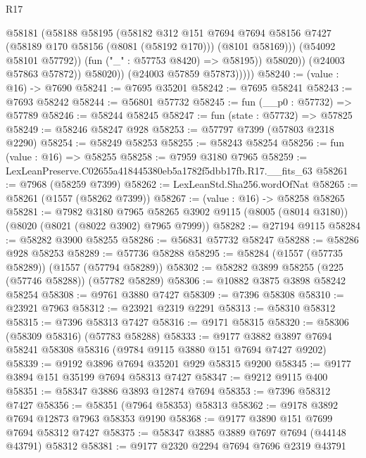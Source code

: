 \begin{lexlean}{R17}
\begin{coremodule}
                        @58181
                          (@58188
                            @58195
                            (@58182
                              @312
                              @151
                              @7694
                              @7694
                              @58156
                              @7427
                              (@58189 @170 @58156 (@8081 (@58192 @170)))
                              (@8101 @58169)))
                          (@54092 @58101 @57792))
                        (fun ("_" : @57753 @8420) => @58195))
                      @58020))
                  (@24003 @57863 @57872))
                @58020))
            (@24003 @57859 @57873)))))
@58240 := (value : @16) -> @7690
@58241 := @7695 @35201
@58242 := @7695 @58241
@58243 := @7693 @58242
@58244 := @56801 @57732
@58245 := fun (__p0 : @57732) => @57789
@58246 := @58244 @58245
@58247 := fun (state : @57732) => @57825
@58249 := @58246 @58247 @928
@58253 := @57797 @7399 (@57803 @2318 @2290)
@58254 := @58249 @58253
@58255 := @58243 @58254
@58256 := fun (value : @16) => @58255
@58258 := @7959 @3180 @7965
@58259 := LexLeanPreserve.C02655a418445380eb5a1782f5dbb17fb.R17.__fits_63
@58261 := @7968 (@58259 @7399)
@58262 := LexLeanStd.Sha256.wordOfNat
@58265 := @58261 (@1557 (@58262 @7399))
@58267 := (value : @16) -> @58258 @58265
@58281 := @7982
    @3180
    @7965
    @58265
    @3902
    @9115
    (@8005 (@8014 @3180))
    (@8020 (@8021 (@8022 @3902) @7965 @7999))
@58282 := @27194 @9115
@58284 := @58282 @3900 @58255
@58286 := @56831 @57732 @58247
@58288 := @58286 @928 @58253
@58289 := @57736 @58288
@58295 := @58284 (@1557 (@57735 @58289)) (@1557 (@57794 @58289))
@58302 := @58282 @3899 @58255 (@225 (@57746 @58288)) (@57782 @58289)
@58306 := @10882 @3875 @3898 @58242 @58254
@58308 := @9761 @3880 @7427
@58309 := @7396 @58308
@58310 := @23921 @7963
@58312 := @23921 @2319 @2291
@58313 := @58310 @58312
@58315 := @7396 @58313 @7427
@58316 := @9171 @58315
@58320 := @58306 (@58309 @58316) (@57783 @58288)
@58333 := @9177 @3882 @3897 @7694 @58241 @58308 @58316 (@9784 @9115 @3880 @151 @7694 @7427 @9202)
@58339 := @9192 @3896 @7694 @35201 @929 @58315 @9200
@58345 := @9177 @3894 @151 @35199 @7694 @58313 @7427
@58347 := @9212 @9115 @400
@58351 := @58347 @3886 @3893 @12874 @7694
@58353 := @7396 @58312 @7427
@58356 := @58351 (@7964 @58353) @58313
@58362 := @9178 @3892 @7694 @12873 @7963 @58353 @9190
@58368 := @9177 @3890 @151 @7699 @7694 @58312 @7427
@58375 := @58347 @3885 @3889 @7697 @7694 (@44148 @43791) @58312
@58381 := @9177 @2320 @2294 @7694 @7696 @2319 @43791

\end{coremodule}
\end{lexlean}
